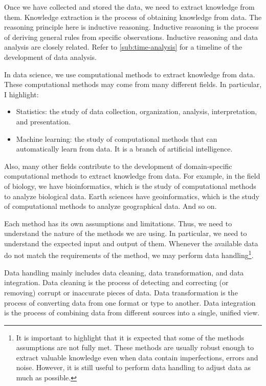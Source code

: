 Once we have collected and stored the data, we need to extract knowledge from them.
Knowledge extraction is the process of obtaining knowledge from data.  The reasoning
principle here is inductive reasoning.  Inductive reasoning is the process of deriving
general rules from specific observations.  Inductive reasoning and data analysis
are closely related.  Refer to \cref{sub:time-analysis} for a timeline of the development
of data analysis.

In data science, we use computational methods to extract knowledge from data.  These
computational methods may come from many different fields.  In particular, I highlight:
\begin{itemize}
  \item Statistics: the study of data collection, organization, analysis, interpretation,
    and presentation.
  \item Machine learning: the study of computational methods that can automatically learn from data.
    It is a branch of artificial intelligence.
\end{itemize}

Also, many other fields contribute to the development of domain-specific computational
methods to extract knowledge from data.  For example, in the field of biology, we have
bioinformatics, which is the study of computational methods to analyze biological data.
Earth sciences have geoinformatics, which is the study of computational methods to
analyze geographical data.  And so on.

Each method has its own assumptions and limitations.  Thus, we need to understand the
nature of the methods we are using.  In particular, we need to understand the
expected input and output of them.  Whenever the available data do not match the
requirements of the method, we may perform data handling\footnote{%
  It is important to highlight that it is expected that some of the methods assumptions
  are not fully met.  These methods are usually robust enough to extract valuable
  knowledge even when data contain imperfections, errors and noise.  However, it is still
  useful to perform data handling to adjust data as much as possible.%
}.

Data handling mainly includes data cleaning, data transformation, and data
integration. Data cleaning is the process of detecting and correcting (or removing)
corrupt or inaccurate pieces of data.  Data transformation is the process of converting
data from one format or type to another.  Data integration is the process of combining
data from different sources into a single, unified view.

